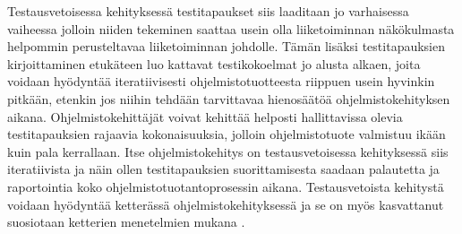   Testausvetoisessa kehityksessä testitapaukset siis laaditaan jo varhaisessa vaiheessa jolloin niiden tekeminen saattaa usein olla liiketoiminnan näkökulmasta helpommin perusteltavaa liiketoiminnan johdolle.
  Tämän lisäksi testitapauksien kirjoittaminen etukäteen luo kattavat testikokoelmat jo alusta alkaen, joita voidaan hyödyntää iteratiivisesti ohjelmistotuotteesta riippuen usein hyvinkin pitkään, etenkin jos niihin tehdään tarvittavaa hienosäätöä ohjelmistokehityksen aikana.
  Ohjelmistokehittäjät voivat kehittää helposti hallittavissa olevia testitapauksien rajaavia kokonaisuuksia, jolloin ohjelmistotuote valmistuu ikään kuin pala kerrallaan.
  Itse ohjelmistokehitys on testausvetoisessa kehityksessä siis iteratiivista ja näin ollen testitapauksien suorittamisesta saadaan palautetta ja raportointia koko ohjelmistotuotantoprosessin aikana.
  Testausvetoista kehitystä voidaan hyödyntää ketterässä ohjelmistokehityksessä ja se on myös kasvattanut suosiotaan ketterien menetelmien mukana \parencite{tdd_popularity}.

